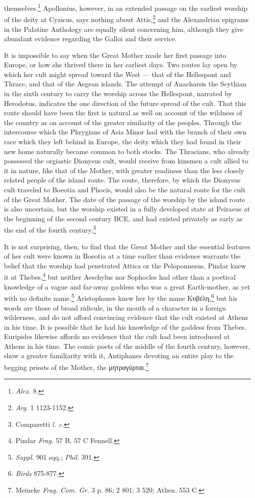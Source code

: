 \documentclass[a4paper, 11pt, oneside, polutonikogreek, french]{article}
\begin{document}
themselves.\footnote{\emph{Alex.} 8.} Apollonius, however, in an extended passage on the earliest worship of the deity at Cyzicus, says nothing about Attis,\footnote{\emph{Arg.} 1 1123-1152.} and the Alexandrian epigrams in the Palatine Anthology are equally silent concerning him, although they give abundant evidence regarding the Galloi and their service.

It is impossible to say when the Great Mother made her first passage into Europe, or how she thrived there in her earliest days. Two routes lay open by which her cult might spread toward the West --- that of the Hellespont and Thrace, and that of the Aegean islands. The attempt of Anacharsis the Scythian in the sixth century to carry the worship across the Hellespont, narrated by Herodotus, indicates the one direction of the future spread of the cult. That this route should have been the first is natural as well on account of the wildness of the country as on account of the greater similarity of the peoples. Through the intercourse which the Phrygians of Asia Minor had with the branch of their own race which they left behind in Europe, the deity which they had found in their new home naturally became common to both stocks. The Thracians, who already possessed the orgiastic Dionysus cult, would receive from kinsmen a cult allied to it in nature, like that of the Mother, with greater readiness than the less closely related people of the island route. The route, therefore, by which the Dionysus cult traveled to Boeotia and Phocis, would also be the natural route for the cult of the Great Mother. The date of the passage of the worship by the island route is also uncertain, but the worship existed in a fully developed state at Peiraeus at the beginning of the second century \textsc{BCE}, and had existed privately as early as the end of the fourth century.\footnote{Comparetti \emph{l. c.}}

It is not surprising, then, to find that the Great Mother and the essential features of her cult were known in Boeotia at a time earlier than evidence warrants the belief that the worship had penetrated Attica or the Peloponnesus. Pindar knew it at Thebes,\footnote{Pindar \emph{Frag.} 57 B, 57 C Fennell.} but neither Aeschylus nor Sophocles had other than a poetical knowledge of a vague and far-away goddess who was a great Earth-mother, as yet with no definite name.\footnote{\emph{Suppl.} 901 sqq.; \emph{Phil.} 391.} Aristophanes knew her by the name Κυβέλη,\footnote{\emph{Birds} 875-877.} but his words are those of broad ridicule, in the mouth of a character in a foreign wilderness, and do not afford convincing evidence that the cult existed at Athens in his time. It is possible that he had his knowledge of the goddess from Thebes. Euripides likewise affords no evidence that the cult had been introduced at Athens in his time. The comic poets of the middle of the fourth century, however, show a greater familiarity with it, Antiphanes devoting an entire play to the begging priests of the Mother, the μητραγύρται.\footnote{Meineke \emph{Frag. Com. Gr.} 3 p. 86; 2 801; 3 520; Athen. 553 C.}
\end{document}
